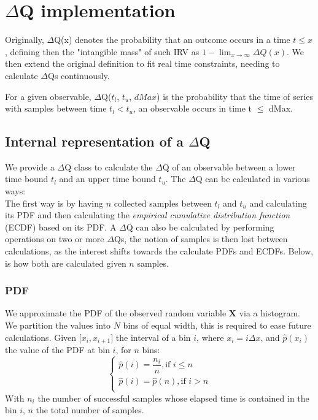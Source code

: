 \section{$\Delta$Q implementation}

Originally, $\Delta$Q(x) denotes the probability that an outcome occurs in a time $t \le x$, defining then the "intangible mass" of such IRV as $1 - \lim_{x\to\infty} \Delta Q (x)$.
We then extend the original definition to fit real time constraints, needing to calculate $\Delta$Qs continuously.

For a given observable, $\Delta$Q($t_l$, $t_u$, $dMax$) is the probability that the time of series with samples between time $t_l < t_u$, an observable occurs in time t $\le$ dMax.


\subsection{Internal representation of a $\Delta$Q}
    We provide a $\Delta$Q class to calculate the $\Delta$Q of an observable between a lower time bound $t_l$ and an upper time bound $t_u$.
    The $\Delta$Q can be calculated in various ways: \\
    The first way is by having $n$ collected samples between $t_l$ and $t_u$ and calculating its PDF and then calculating the \textit{empirical cumulative distribution function} (ECDF) based on its PDF.
    A $\Delta$Q can also be calculated by performing operations on two or more $\Delta$Qs, the notion of samples is then lost between calculations, as the interest shifts towards the calculate PDFs and ECDFs.
    Below, is how both are calculated given $n$ samples.
    \subsubsection{PDF}
  We approximate the PDF of the observed random variable $\textbf{X}$ via a histogram. We partition the values into $N$ bins of equal width, this is required to ease future calculations.
        Given $\lbrack x_i, x_{i+1} \rbrack$ the interval of a bin $i$, where $x_i = i\Delta x$, and $\hat{p}(x_i)$ the value of the PDF at bin $i$, for $n$ bins:
        \begin{equation}
            \begin{cases}
                \hat{p}(i) = \dfrac{n_i}{n}, \text{if } i \le n \\
                \hat{p}(i) = \hat{p}(n), \text{if } i > n \\
            \end{cases}
            \label{eq:pdf}
        \end{equation}
   With $n_i$ the number of successful samples whose elapsed time is contained in the bin $i$, $n$ the total number of samples.
